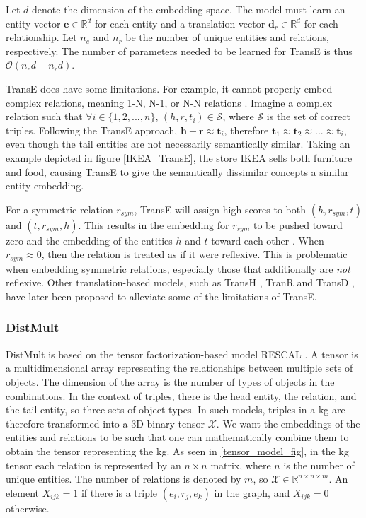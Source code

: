 Let $d$ denote the dimension of the embedding space. The model must learn an entity vector $\textbf{e}\in \mathbb{R}^d$ for each entity and a translation vector $\textbf{d}_r\in \mathbb{R}^d$ for each relationship. Let $n_e$ and $n_r$ be the number of unique entities and relations, respectively. The number of parameters needed to be learned for TransE is thus $\mathcal{O}(n_e d + n_r d)$.


TransE does have some limitations. For example, it cannot properly embed complex relations, meaning 1-N, N-1, or N-N relations \cite{transH, transR}. Imagine a complex relation such that $\forall i \in \{1,2, ..., n\}$, $(h, r, t_i )\in \mathcal{S}$, where $\mathcal{S}$ is the set of correct triples. Following the TransE approach, $\textbf{h}+\textbf{r}\approx \textbf{t}_i$, therefore $\textbf{t}_1 \approx \textbf{t}_2 \approx ... \approx \textbf{t}_i$, even though the tail entities are not necessarily semantically similar. Taking an example depicted in figure \ref{IKEA_TransE}, the store IKEA sells both furniture and food, causing TransE to give the semantically dissimilar concepts a similar entity embedding. 

For a symmetric relation $r_{sym}$, TransE will assign high scores to both $(h, r_{sym}, t)$ and $(t, r_{sym}, h)$. This results in the embedding for $r_{sym}$ to be pushed toward zero and the embedding of the entities $h$ and $t$ toward each other \cite{wang2018evaluating}. When $r_{sym} \approx 0$, then the relation is treated as if it were reflexive. This is problematic when embedding symmetric relations, especially those that additionally are \textit{not} reflexive. Other translation-based models, such as TransH \cite{transH}, TranR \cite{transR} and TransD \cite{transD}, have later been proposed to alleviate some of the limitations of TransE.

\subsubsection{DistMult}
DistMult is based on the tensor factorization-based model RESCAL \cite{RESCAL}. A tensor is a multidimensional array representing the relationships between multiple sets of objects. The dimension of the array is the number of types of objects in the combinations. In the context of triples, there is the head entity, the relation, and the tail entity, so three sets of object types. In such models, triples in a \gls{kg} are therefore transformed into a 3D binary tensor $\mathcal{X}$. We want the embeddings of the entities and relations to be such that one can mathematically combine them to obtain the tensor representing the \gls{kg}. As seen in \cref{tensor_model_fig}, in the \gls{kg} tensor each relation is represented by an $n \times n$ matrix, where $n$ is the number of unique entities. The number of relations is denoted by $m$, so $\mathcal{X}\in \mathbb{R}^{n \times n \times m}$. An element $X_{ijk} = 1$ if there is a triple $(e_i, r_j, e_k)$ in the graph, and $X_{ijk} = 0$ otherwise.


